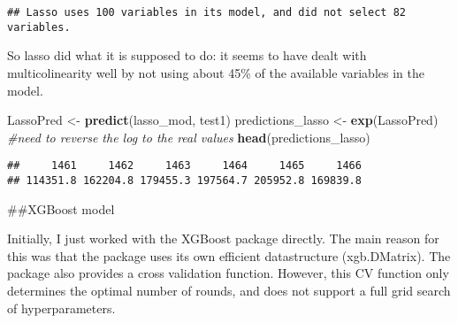 \documentclass[]{article}
\newenvironment{Shaded}{\begin{snugshade}}{\end{snugshade}}
\newcommand{\CommentTok}[1]{\textcolor[rgb]{0.56,0.35,0.01}{\textit{#1}}}
\newcommand{\DataTypeTok}[1]{\textcolor[rgb]{0.13,0.29,0.53}{#1}}
\newcommand{\DecValTok}[1]{\textcolor[rgb]{0.00,0.00,0.81}{#1}}
\newcommand{\KeywordTok}[1]{\textcolor[rgb]{0.13,0.29,0.53}{\textbf{#1}}}
\newcommand{\NormalTok}[1]{#1}
\newcommand{\OperatorTok}[1]{\textcolor[rgb]{0.81,0.36,0.00}{\textbf{#1}}}
\newcommand{\StringTok}[1]{\textcolor[rgb]{0.31,0.60,0.02}{#1}}
\begin{document}
\begin{Shaded}
\end{Shaded}

\begin{verbatim}
## Lasso uses 100 variables in its model, and did not select 82 variables.
\end{verbatim}

So lasso did what it is supposed to do: it seems to have dealt with
multicolinearity well by not using about 45\% of the available variables
in the model.

\begin{Shaded}
\begin{Highlighting}[]
\NormalTok{LassoPred <-}\StringTok{ }\KeywordTok{predict}\NormalTok{(lasso_mod, test1)}
\NormalTok{predictions_lasso <-}\StringTok{ }\KeywordTok{exp}\NormalTok{(LassoPred) }\CommentTok{#need to reverse the log to the real values}
\KeywordTok{head}\NormalTok{(predictions_lasso)}
\end{Highlighting}
\end{Shaded}

\begin{verbatim}
##     1461     1462     1463     1464     1465     1466 
## 114351.8 162204.8 179455.3 197564.7 205952.8 169839.8
\end{verbatim}

\#\#XGBoost model

Initially, I just worked with the XGBoost package directly. The main
reason for this was that the package uses its own efficient
datastructure (xgb.DMatrix). The package also provides a cross
validation function. However, this CV function only determines the
optimal number of rounds, and does not support a full grid search of
hyperparameters.
\end{document}
